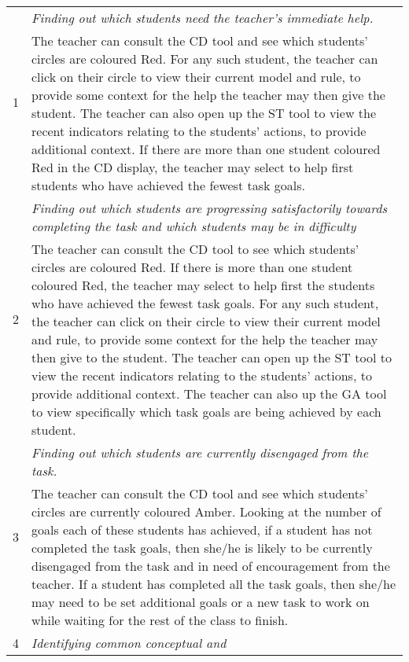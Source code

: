 \begin{table}[htbp]
  \begin{tabular}{|p{0.5cm}|p{12.5cm}|}
  \hline \multirow{2}{*}{1} & \emph{Finding out which students need
    the teacher's
    immediate help.} \\
  \cline{2-2} & The teacher can consult the CD tool and see which
  students' circles are coloured Red. For any such student, the
  teacher can click on their circle to view their current model and
  rule, to provide some context for the help the teacher may then give
  the student. The teacher can also open up the ST tool to view the
  recent indicators relating to the students' actions, to provide
  additional context. If there are more than one student coloured Red
  in the CD display, the teacher may select to help first students who
  have achieved the fewest
  task goals. \\
  \hline \multirow{2}{*}{2} & \emph{Finding out which students are
    progressing satisfactorily towards completing the task and which
    students may be in difficulty} \\
  \cline{2-2} 
  & The teacher can consult the CD tool to see which
  students' circles are coloured Red. 
  If there is more than one student coloured Red,
  the teacher may select to help first the students who
  have achieved the fewest task goals. For any such student, the
  teacher can click on their circle to view their current model and
  rule, to provide some context for the help the teacher may then give
  to the student. The teacher can open up the ST tool to view the
  recent indicators relating to the students' actions, to provide
  additional context. The teacher can also up the GA tool to view specifically
  which task goals are being achieved by each student. 
  \\
  \hline \multirow{2}{*}{3} & \emph{Finding out which students are
    currently disengaged from the task.} \\
  \cline{2-2} 
  & The teacher can consult the CD tool and see which students'
  circles are currently coloured Amber. Looking at the number of goals
  each of these students has achieved, if a student has not completed
  the task goals, then she/he is likely to be currently disengaged
  from the task and in need of encouragement from the teacher. If a
  student has completed all the task goals, then she/he may need to be
  set additional goals or a new task to work on while waiting for the
  rest of the class to finish. \\
  \hline \multirow{2}{*}{4} & \emph{Identifying common conceptual and
}
\end{tabular}
\end{table}
